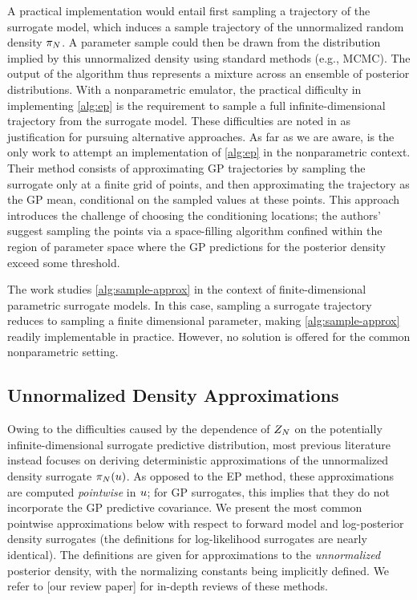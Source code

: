 \documentclass[12pt]{article}
\begin{document}
A practical implementation 
would entail first sampling a trajectory of the surrogate model, which induces a sample 
trajectory of the unnormalized random density $\llikEmRdmDens[\Ndesign]$. A parameter sample 
could then be drawn from the distribution implied by this unnormalized density using standard 
methods (e.g., MCMC). The output of the algorithm thus represents a mixture across an 
ensemble of posterior distributions. With a nonparametric emulator, the practical difficulty in 
implementing \cref{alg:ep} is the requirement to sample a full infinite-dimensional 
trajectory from the surrogate model.
These difficulties are noted in \citet{VehtariParallelGP} as justification for pursuing alternative 
approaches. As far as we are aware, \citet{trainDynamics} is the only work to attempt an 
implementation of \cref{alg:ep} in the nonparametric context. Their method consists of approximating GP 
trajectories by sampling the surrogate only at a finite grid of points, and then approximating 
the trajectory as the GP mean, conditional on the sampled values at these points.
This approach introduces the challenge of choosing the conditioning locations; the authors' 
suggest sampling the points via a space-filling algorithm confined within the region of parameter 
space where the GP predictions for the posterior density exceed some threshold.

The work \citet{BurknerSurrogate} studies \cref{alg:sample-approx} in the context of finite-dimensional
parametric surrogate models. In this case, sampling a surrogate trajectory reduces to sampling a 
finite dimensional parameter, making \cref{alg:sample-approx} readily implementable in practice.
However, no solution is offered for the common nonparametric setting.

\subsection{Unnormalized Density Approximations}
Owing to the difficulties caused by the dependence of $\llikEmRdm[\Ndesign]{\normCst}$ on the 
potentially infinite-dimensional surrogate predictive distribution, most previous literature instead
focuses on deriving deterministic approximations of the unnormalized
density surrogate $\llikEmRdmDens[\Ndesign](\Par)$. As opposed to the EP method, these 
approximations are computed \textit{pointwise} in $\Par$; for GP surrogates, this implies 
that they do not incorporate the GP predictive covariance. We present the most common 
pointwise approximations below with respect to forward model and log-posterior density 
surrogates (the definitions for log-likelihood surrogates are nearly identical). The definitions 
are given for approximations to the \textit{unnormalized} posterior density, with the normalizing 
constants being implicitly defined. We refer to [our review paper] for in-depth reviews of these methods.
\end{document}
